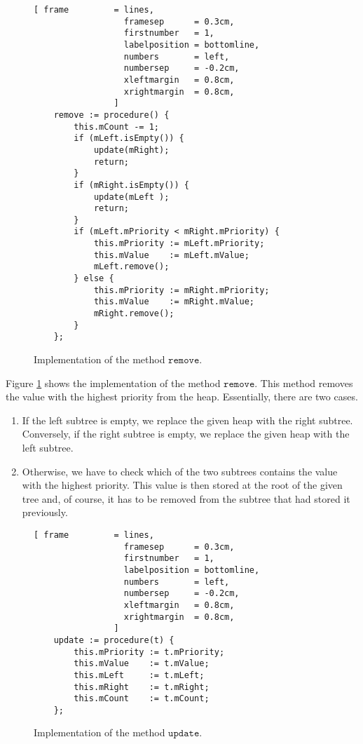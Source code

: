 \begin{figure}[!ht]
\centering
\begin{Verbatim}[ frame         = lines, 
                  framesep      = 0.3cm, 
                  firstnumber   = 1,
                  labelposition = bottomline,
                  numbers       = left,
                  numbersep     = -0.2cm,
                  xleftmargin   = 0.8cm,
                  xrightmargin  = 0.8cm,
                ]
    remove := procedure() {
        this.mCount -= 1;
        if (mLeft.isEmpty()) { 
            update(mRight); 
            return;
        } 
        if (mRight.isEmpty()) { 
            update(mLeft ); 
            return;
        }
        if (mLeft.mPriority < mRight.mPriority) {
            this.mPriority := mLeft.mPriority;
            this.mValue    := mLeft.mValue;
            mLeft.remove();
        } else {
            this.mPriority := mRight.mPriority;
            this.mValue    := mRight.mValue;
            mRight.remove();
        }
    };
\end{Verbatim}
\vspace*{-0.3cm}
\caption{Implementation of the method $\mathtt{remove}$.}
\label{fig:heap.stlx-remove}
\end{figure}

\noindent
Figure \ref{fig:heap.stlx-remove} shows the implementation of the method $\mathtt{remove}$.  This
method removes the value with the highest priority from the heap.  Essentially, there are two
cases.
\begin{enumerate}
\item If the left subtree is empty, we replace the given heap with the right subtree. 
      Conversely, if the right subtree is empty, we replace the given heap with the  left subtree.
\item Otherwise, we have to check which of the two subtrees contains the value with the highest
      priority.  This value is then stored at the root of the given tree and, of course,
      it has to be removed from the subtree that had stored it previously.
\end{enumerate}

\begin{figure}[!ht]
\centering
\begin{Verbatim}[ frame         = lines, 
                  framesep      = 0.3cm, 
                  firstnumber   = 1,
                  labelposition = bottomline,
                  numbers       = left,
                  numbersep     = -0.2cm,
                  xleftmargin   = 0.8cm,
                  xrightmargin  = 0.8cm,
                ]
    update := procedure(t) {
        this.mPriority := t.mPriority;
        this.mValue    := t.mValue;
        this.mLeft     := t.mLeft;
        this.mRight    := t.mRight;
        this.mCount    := t.mCount;
    };      
\end{Verbatim}
\vspace*{-0.3cm}
\caption{Implementation of the method $\mathtt{update}$.}
\label{fig:heap.stlx-update}
\end{figure}

